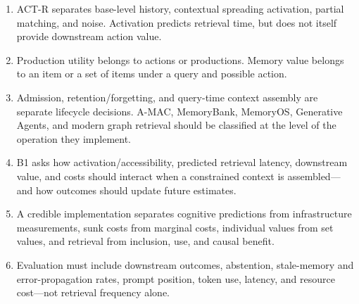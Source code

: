 \begin{chapterrecap}
\begin{enumerate}
  \item ACT-R separates base-level history, contextual spreading activation, partial matching, and noise. Activation predicts retrieval time, but does not itself provide downstream action value.
  \item Production utility belongs to actions or productions. Memory value belongs to an item or a set of items under a query and possible action.
  \item Admission, retention/forgetting, and query-time context assembly are separate lifecycle decisions. A-MAC, MemoryBank, MemoryOS, Generative Agents, and modern graph retrieval should be classified at the level of the operation they implement.
  \item B1 asks how activation/accessibility, predicted retrieval latency, downstream value, and costs should interact when a constrained context is assembled—and how outcomes should update future estimates.
  \item A credible implementation separates cognitive predictions from infrastructure measurements, sunk costs from marginal costs, individual values from set values, and retrieval from inclusion, use, and causal benefit.
  \item Evaluation must include downstream outcomes, abstention, stale-memory and error-propagation rates, prompt position, token use, latency, and resource cost—not retrieval frequency alone.
\end{enumerate}
\end{chapterrecap}

